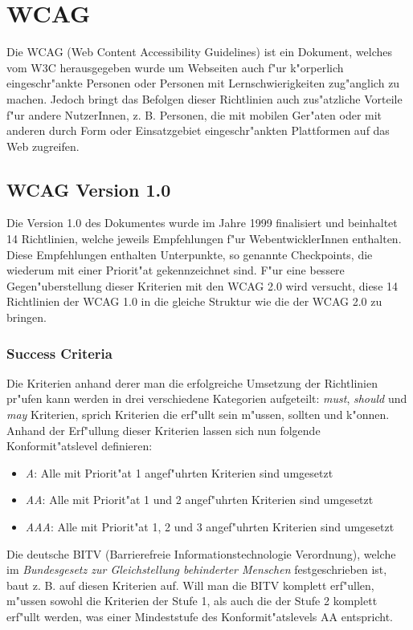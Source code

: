 \documentclass[a4paper,bibtotoc,oneside]{scrbook}
\begin{document}
\chapter{WCAG}
Die WCAG (Web Content Accessibility Guidelines) ist ein Dokument, welches vom W3C herausgegeben wurde um Webseiten auch f"ur k"orperlich eingeschr"ankte Personen oder Personen mit Lernschwierigkeiten zug"anglich zu machen. Jedoch bringt das Befolgen dieser Richtlinien auch zus"atzliche Vorteile f"ur andere NutzerInnen, z. B. Personen, die mit mobilen Ger"aten oder mit anderen durch Form oder Einsatzgebiet eingeschr"ankten Plattformen auf das Web zugreifen. \cite[Abschnitt Abstract]{wcag1}


\section{WCAG Version 1.0}
Die Version 1.0 des Dokumentes wurde im Jahre 1999 finalisiert und beinhaltet 14 Richtlinien, welche jeweils Empfehlungen f"ur WebentwicklerInnen enthalten. Diese Empfehlungen enthalten Unterpunkte, so genannte Checkpoints, die wiederum mit einer Priorit"at gekennzeichnet sind. \cite[Abschnitt Abstract]{wcag1}
F"ur eine bessere Gegen"uberstellung dieser Kriterien mit den WCAG 2.0 wird versucht, diese 14 Richtlinien der WCAG 1.0 in die gleiche Struktur wie die der WCAG 2.0 zu bringen.

\subsection{Success Criteria}
Die Kriterien anhand derer man die erfolgreiche Umsetzung der Richtlinien pr"ufen kann werden in drei verschiedene Kategorien aufgeteilt: \emph{must}, \emph{should} und \emph{may} Kriterien, sprich Kriterien die erf"ullt sein m"ussen, sollten und k"onnen. Anhand der Erf"ullung dieser Kriterien lassen sich nun folgende Konformit"atslevel definieren: \cite[Abschnitt 4]{wcag1}

\begin{itemize}
\item \emph{A}: Alle mit Priorit"at 1 angef"uhrten Kriterien sind umgesetzt
\item \emph{AA}: Alle mit Priorit"at 1 und 2 angef"uhrten Kriterien sind umgesetzt
\item \emph{AAA}: Alle mit Priorit"at 1, 2 und 3 angef"uhrten Kriterien sind umgesetzt
\end{itemize}

Die deutsche BITV (Barrierefreie Informationstechnologie Verordnung), welche im \emph{Bundesgesetz zur Gleichstellung behinderter Menschen} festgeschrieben ist, baut z. B. auf diesen Kriterien auf. Will man die BITV komplett erf"ullen, m"ussen sowohl die Kriterien der Stufe 1, als auch die der Stufe 2 komplett erf"ullt werden, was einer Mindeststufe des Konformit"atslevels AA entspricht. \cite[S. 38-39]{barr_webd}
\end{document}
